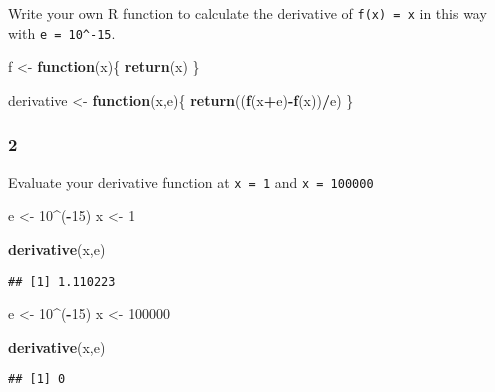 \documentclass[
]{article}
\newenvironment{Shaded}{\begin{snugshade}}{\end{snugshade}}
\newcommand{\ControlFlowTok}[1]{\textcolor[rgb]{0.13,0.29,0.53}{\textbf{#1}}}
\newcommand{\DecValTok}[1]{\textcolor[rgb]{0.00,0.00,0.81}{#1}}
\newcommand{\KeywordTok}[1]{\textcolor[rgb]{0.13,0.29,0.53}{\textbf{#1}}}
\newcommand{\NormalTok}[1]{#1}
\newcommand{\OperatorTok}[1]{\textcolor[rgb]{0.81,0.36,0.00}{\textbf{#1}}}
\newcommand{\StringTok}[1]{\textcolor[rgb]{0.31,0.60,0.02}{#1}}
\begin{document}
Write your own R function to calculate the derivative of
\texttt{f(x)\ =\ x} in this way with \texttt{e\ =\ 10\^{}-15}.

\begin{Shaded}
\begin{Highlighting}[]
\NormalTok{  f <-}\StringTok{ }\ControlFlowTok{function}\NormalTok{(x)\{}
  \KeywordTok{return}\NormalTok{(x)}
\NormalTok{  \}}

\NormalTok{derivative <-}\StringTok{ }\ControlFlowTok{function}\NormalTok{(x,e)\{}
  \KeywordTok{return}\NormalTok{((}\KeywordTok{f}\NormalTok{(x}\OperatorTok{+}\NormalTok{e)}\OperatorTok{-}\KeywordTok{f}\NormalTok{(x))}\OperatorTok{/}\NormalTok{e)}
\NormalTok{\}}
\end{Highlighting}
\end{Shaded}

\hypertarget{section-3}{%
\subsubsection{2}\label{section-3}}

Evaluate your derivative function at \texttt{x\ =\ 1} and
\texttt{x\ =\ 100000}

\begin{Shaded}
\begin{Highlighting}[]
\NormalTok{e <-}\StringTok{ }\DecValTok{10}\OperatorTok{^}\NormalTok{(}\OperatorTok{-}\DecValTok{15}\NormalTok{)}
\NormalTok{x <-}\StringTok{ }\DecValTok{1}

\KeywordTok{derivative}\NormalTok{(x,e)}
\end{Highlighting}
\end{Shaded}

\begin{verbatim}
## [1] 1.110223
\end{verbatim}

\begin{Shaded}
\begin{Highlighting}[]
\NormalTok{e <-}\StringTok{ }\DecValTok{10}\OperatorTok{^}\NormalTok{(}\OperatorTok{-}\DecValTok{15}\NormalTok{)}
\NormalTok{x <-}\StringTok{ }\DecValTok{100000}

\KeywordTok{derivative}\NormalTok{(x,e)}
\end{Highlighting}
\end{Shaded}

\begin{verbatim}
## [1] 0
\end{verbatim}
\end{document}

